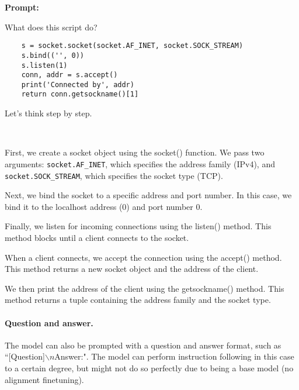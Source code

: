 \begin{AIbox}{}
\textbf{\color{purple}Prompt:}\\ \tt{\color{purple}\footnotesize What does this script do?
\begin{lstlisting}
    s = socket.socket(socket.AF_INET, socket.SOCK_STREAM)
    s.bind(('', 0))
    s.listen(1)
    conn, addr = s.accept()
    print('Connected by', addr)
    return conn.getsockname()[1]
\end{lstlisting}
Let's think step by step.}
\\
\begin{minipage}[t]{0.99\linewidth}
First, we create a socket object using the socket() function. We pass two arguments: \texttt{socket.AF\_INET}, which specifies the address family (IPv4), and \texttt{socket.SOCK\_STREAM}, which specifies the socket type (TCP).

Next, we bind the socket to a specific address and port number. In this case, we bind it to the localhost address (0) and port number 0.

Finally, we listen for incoming connections using the listen() method. This method blocks until a client connects to the socket.

When a client connects, we accept the connection using the accept() method. This method returns a new socket object and the address of the client.

We then print the address of the client using the getsockname() method. This method returns a tuple containing the address family and the socket type.
\end{minipage}
\end{AIbox}

\paragraph{Question and answer.} The model can also be prompted with a question and answer format, such as ``[Question]$\backslash n$Answer:". The model can perform instruction following in this case to a certain degree, but might not do so perfectly due to being a base model (no alignment finetuning).

